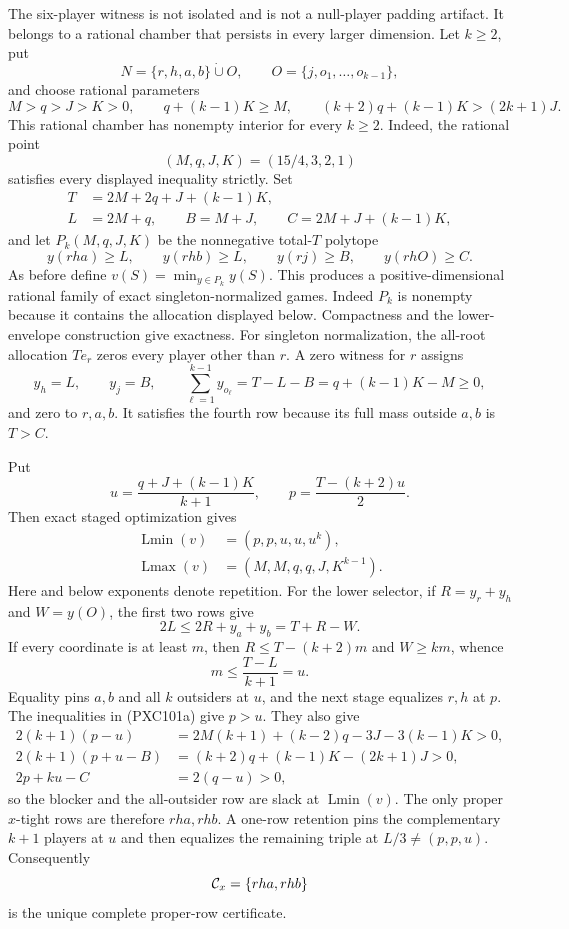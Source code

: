 \documentclass[11pt]{article}
\newcommand{\Lmin}{\operatorname{Lmin}}
\newcommand{\Lmax}{\operatorname{Lmax}}
\begin{document}
The six-player witness is not isolated and is not a null-player padding
artifact.  It belongs to a rational chamber that persists in every larger
dimension.  Let \(k\ge2\), put
\[
 N=\{r,h,a,b\}\mathbin{\dot\cup}O,\qquad
 O=\{j,o_1,\ldots,o_{k-1}\},
\]
and choose rational parameters
\[
 M>q>J>K>0,\qquad q+(k-1)K\ge M,\qquad
 (k+2)q+(k-1)K>(2k+1)J.                       \tag{PXC101a}
\]
This rational chamber has nonempty interior for every \(k\ge2\).  Indeed,
the rational point
\[
 (M,q,J,K)=(15/4,3,2,1)
\]
satisfies every displayed inequality strictly.
Set
\[
\begin{split}
 T&=2M+2q+J+(k-1)K,\\
 L&=2M+q,\qquad B=M+J,\qquad
 C=2M+J+(k-1)K,
\end{split}
\]
and let \(P_k(M,q,J,K)\) be the nonnegative total-\(T\) polytope
\[
 y(rha)\ge L,\qquad y(rhb)\ge L,\qquad
 y(rj)\ge B,\qquad y(rhO)\ge C.                \tag{PXC101b}
\]
As before define \(v(S)=\min_{y\in P_k}y(S)\).  This produces a
positive-dimensional rational family of exact singleton-normalized games.
Indeed \(P_k\) is nonempty because it contains the allocation displayed
below.  Compactness and the lower-envelope construction give exactness.
For singleton normalization, the all-root allocation \(T e_r\) zeros every
player other than \(r\).  A zero witness for \(r\) assigns
\[
 y_h=L,\qquad y_j=B,\qquad
 \sum_{\ell=1}^{k-1}y_{o_\ell}=T-L-B
    =q+(k-1)K-M\ge0,
\]
and zero to \(r,a,b\).  It satisfies the fourth row because its full mass
outside \(a,b\) is \(T>C\).

Put
\[
 u=\frac{q+J+(k-1)K}{k+1},\qquad
 p=\frac{T-(k+2)u}{2}.
\]
Then exact staged optimization gives
\begin{equation}
\begin{split}
 \Lmin(v)&=(p,p,u,u,u^k),\\
 \Lmax(v)&=(M,M,q,q,J,K^{k-1}).
\end{split}
\tag{PXC101c}
\end{equation}
Here and below exponents denote repetition.  For the lower selector, if
\(R=y_r+y_h\) and \(W=y(O)\), the first two rows give
\[
 2L\le2R+y_a+y_b=T+R-W.
\]
If every coordinate is at least \(m\), then
\(R\le T-(k+2)m\) and \(W\ge km\), whence
\[
 m\le\frac{T-L}{k+1}=u.
\]
Equality pins \(a,b\) and all \(k\) outsiders at \(u\), and the next stage
equalizes \(r,h\) at \(p\).  The inequalities in (PXC101a) give \(p>u\).
They also give
\[
 \begin{split}
 2(k+1)(p-u)
  &=2M(k+1)+(k-2)q-3J-3(k-1)K>0,\\
 2(k+1)(p+u-B)
  &=(k+2)q+(k-1)K-(2k+1)J>0,\\
 2p+ku-C&=2(q-u)>0,
 \end{split}
\]
so the blocker and the all-outsider row are slack at \(\Lmin(v)\).
The only proper \(x\)-tight rows are therefore \(rha,rhb\).  A one-row
retention pins the complementary \(k+1\) players at \(u\) and then
equalizes the remaining triple at \(L/3\ne(p,p,u)\).  Consequently
\[
 {\cal C}_x=\{rha,rhb\}
\]
is the unique complete proper-row certificate.
\end{document}
